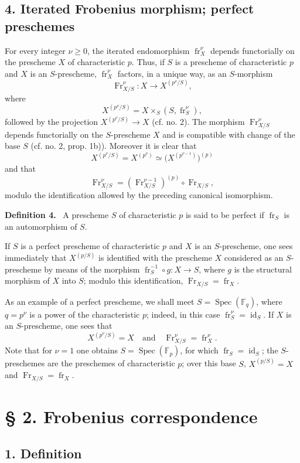 \documentclass[11pt]{article}
\newenvironment{statement}[1]{\par\medskip\noindent\textbf{#1.}\ }{\par\medskip}
\DeclareMathOperator{\Spec}{Spec}
\providecommand{\id}{\operatorname{id}}
\providecommand{\id}{\operatorname{id}}
\providecommand{\id}{\operatorname{id}}
\providecommand{\id}{\operatorname{id}}
\providecommand{\Spec}{\operatorname{Spec}}
\providecommand{\Spec}{\operatorname{Spec}}
\providecommand{\id}{\operatorname{id}}
\providecommand{\Spec}{\operatorname{Spec}}
\providecommand{\fr}{\operatorname{fr}}
\providecommand{\Fr}{\operatorname{Fr}}
\providecommand{\Fr}{\operatorname{Fr}}
\providecommand{\fr}{\operatorname{fr}}
\providecommand{\Spec}{\operatorname{Spec}}
\providecommand{\id}{\operatorname{id}}
\begin{document}
\subsection*{4. Iterated Frobenius morphism; perfect preschemes}

For every integer $\nu\geq0$, the iterated endomorphism $\fr_X^\nu$ depends functorially on the prescheme $X$ of characteristic $p$. Thus, if $S$ is a prescheme of characteristic $p$ and $X$ is an $S$-prescheme, $\fr_X^\nu$ factors, in a unique way, as an $S$-morphism
\[
\Fr_{X/S}^\nu:X\longrightarrow X^{(p^\nu/S)},
\]
where
\[
X^{(p^\nu/S)}=X\times_S(S,\fr_S^\nu),
\]
followed by the projection $X^{(p^\nu/S)}\to X$ (cf. no. 2). The morphism $\Fr_{X/S}^\nu$ depends functorially on the $S$-prescheme $X$ and is compatible with change of the base $S$ (cf. no. 2, prop. 1b)). Moreover it is clear that
\[
X^{(p^\nu/S)}=X^{(p^\nu)}\simeq\bigl(X^{(p^{\nu-1})}\bigr)^{(p)}
\]
and that
\[
\Fr_{X/S}^\nu=(\Fr_{X/S}^{\nu-1})^{(p)}\circ\Fr_{X/S},
\]
modulo the identification allowed by the preceding canonical isomorphism.

\begin{statement}{Definition 4}
A prescheme $S$ of characteristic $p$ is said to be perfect if $\fr_S$ is an automorphism of $S$.
\end{statement}

If $S$ is a perfect prescheme of characteristic $p$ and $X$ is an $S$-prescheme, one sees immediately that $X^{(p/S)}$ is identified with the prescheme $X$ considered as an $S$-prescheme by means of the morphism $\fr_S^{-1}\circ g:X\to S$, where $g$ is the structural morphism of $X$ into $S$; modulo this identification, $\Fr_{X/S}=\fr_X$.

As an example of a perfect prescheme, we shall meet $S=\Spec(\mathbb F_q)$, where $q=p^\nu$ is a power of the characteristic $p$; indeed, in this case $\fr_S^\nu=\id_S$. If $X$ is an $S$-prescheme, one sees that
\[
X^{(p^\nu/S)}=X
\quad\text{and}\quad
\Fr_{X/S}^\nu=\fr_X^\nu.
\]
Note that for $\nu=1$ one obtains $S=\Spec(\mathbb F_p)$, for which $\fr_S=\id_S$; the $S$-preschemes are the preschemes of characteristic $p$; over this base $S$, $X^{(p/S)}=X$ and $\Fr_{X/S}=\fr_X$.

\section*{§ 2. Frobenius correspondence}

\subsection*{1. Definition}
\end{document}
